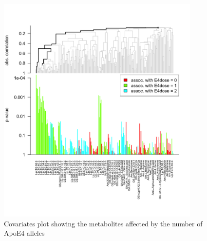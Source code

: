 \documentclass{amsart}
\begin{document}
\begin{figure}[htb]
    \includegraphics[width=0.9\textwidth]{figures/gt2.png}
      \caption{Covariates plot showing the metabolites affected by the number of ApoE4 alleles}
    \label{gt2}
  \end{figure}
  
\end{document}
